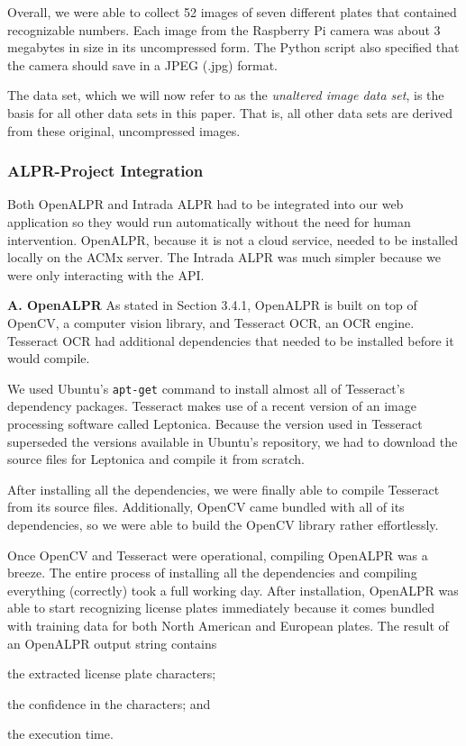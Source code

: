 \documentclass[11pt, oneside, fullpage, doublespace]{article}
\begin{document}
Overall, we were able to collect 52 images of seven different plates that contained recognizable numbers. Each image from the Raspberry Pi camera was about 3 megabytes in size in its uncompressed form. The Python script also specified that the camera should save in a JPEG (.jpg) format.

The data set, which we will now refer to as the \emph{unaltered image data set}, is the basis for all other data sets in this paper. That is, all other data sets are derived from these original, uncompressed images. 

\subsubsection{ALPR-Project Integration}
Both OpenALPR and Intrada ALPR had to be integrated into our web application so they would run automatically without the need for human intervention. OpenALPR, because it is not a cloud service, needed to be installed locally on the ACMx server. The Intrada ALPR was much simpler because we were only interacting with the API.

\textbf{A. OpenALPR}
As stated in Section 3.4.1, OpenALPR is built on top of OpenCV, a computer vision library, and Tesseract OCR, an OCR engine. Tesseract OCR had additional dependencies that needed to be installed before it would compile.

We used Ubuntu's \verb+apt-get+ command to install almost all of Tesseract's dependency packages. Tesseract makes use of a recent version of an image processing software called Leptonica. Because the version used in Tesseract superseded the versions available in Ubuntu's repository, we had to download the source files for Leptonica and compile it from scratch.

After installing all the dependencies, we were finally able to compile Tesseract from its source files. Additionally, OpenCV came bundled with all of its dependencies, so we were able to build the OpenCV library rather effortlessly.

Once OpenCV and Tesseract were operational, compiling OpenALPR was a breeze. The entire process of installing all the dependencies and compiling everything (correctly) took a full working day. After installation, OpenALPR was able to start recognizing license plates immediately because it comes bundled with training data for both North American and European plates. The result of an OpenALPR output string contains
\begin{inparaenum}
\item the extracted license plate characters;
\item the confidence in the characters; and
\item the execution time.
\end{inparaenum}
\end{document}
